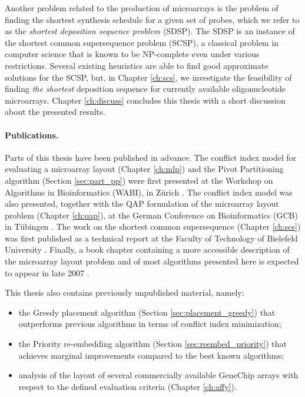 Another problem related to the production of microarrays is the problem of
finding the shortest synthesis schedule for a given set of probes, which we
refer to as the \emph{shortest deposition sequence problem} (SDSP). The SDSP is
an instance of the shortest common supersequence problem (SCSP), a classical
problem in computer science that is known to be NP-complete even under various
restrictions. Several existing heuristics are able to find good approximate
solutions for the SCSP, but, in Chapter \ref{ch:scs}, we investigate the
feasibility of finding \emph{the shortest} deposition sequence for currently
available oligonucleotide microarrays. Chapter \ref{ch:discuss} concludes this
thesis with a short discussion about the presented results.

\paragraph{Publications.}
Parts of this thesis have been published in advance. The conflict index model
for evaluating a microarray layout (Chapter \ref{ch:mlp}) and the Pivot
Partitioning algorithm (Section \ref{sec:part_pp}) were first presented at the
Workshop on Algorithms in Bioinformatics (WABI), in Z\"urich
\citep{Carvalho2006}. The conflict index model was also presented, together with
the QAP formulation of the microarray layout problem (Chapter \ref{ch:qap}), at
the German Conference on Bioinformatics (GCB) in T\"ubingen
\citep{Carvalho2006a}. The work on the shortest common supersequence (Chapter
\ref{ch:scs}) was first published as a technical report at the Faculty of
Technology of Bielefeld University \citep{Carvalho2005}. Finally, a book chapter
containing a more accessible description of the microarray layout problem and of
most algorithms presented here is expected to appear in late 2007
\citep{Carvalho2007}.

This thesis also contains previously unpublished material, namely:
\begin{itemize}
\item the Greedy placement algorithm (Section \ref{sec:placement_greedy}) that
      outperforms previous algorithms in terms of conflict index minimization;
\item the Priority re-embedding algorithm (Section \ref{sec:reembed_priority})
      that achieves marginal improvements compared to the best known algorithms;
\item analysis of the layout of several commercially available GeneChip arrays
      with respect to the defined evaluation criteria (Chapter \ref{ch:affy}).
\end{itemize}

